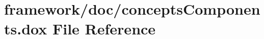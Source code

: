 \hypertarget{concepts_components_8dox}{}\section{framework/doc/concepts\+Components.dox File Reference}
\label{concepts_components_8dox}
